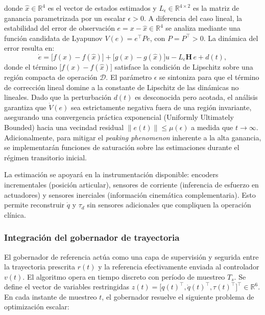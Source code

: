 \documentclass[a4paper,12pt]{article}
\begin{document}
\noindent donde $\hat{x}\in\mathbb{R}^{4}$ es el vector de estados estimados y $L_{\epsilon}\in\mathbb{R}^{4\times 2}$ es la matriz de ganancia parametrizada por un escalar $\epsilon > 0$. A diferencia del caso lineal, la estabilidad del error de observación $e = x - \hat{x}\in\mathbb{R}^{4}$ se analiza mediante una función candidata de Lyapunov $V(e)=e^{\top}Pe$, con $P=P^{\top}>0$. La dinámica del error resulta en:
\begin{equation}
    \dot{e} = \bigl[f(x)-f(\hat{x})\bigr] + \bigl[g(x)-g(\hat{x})\bigr]u - L_{\epsilon}\mathbf{H}\,e + d(t),
    \label{eq:error_obs}
\end{equation}
donde el término $\bigl[f(x)-f(\hat{x})\bigr]$ satisface la condición de Lipschitz sobre una región compacta de operación $\mathcal{D}$. El parámetro $\epsilon$ se sintoniza para que el término de corrección lineal domine a la constante de Lipschitz de las dinámicas no lineales. Dado que la perturbación $d(t)$ es desconocida pero acotada, el análisis garantiza que $\dot{V}(e)$ sea estrictamente negativa fuera de una región invariante, asegurando una convergencia práctica exponencial (Uniformly Ultimately Bounded) hacia una vecindad residual $\|e(t)\| \leq \mu(\epsilon)$ a medida que $t \to \infty$. Adicionalmente, para mitigar el \textit{peaking phenomenon} inherente a la alta ganancia, se implementarán funciones de saturación sobre las estimaciones durante el régimen transitorio inicial.

La estimación se apoyará en la instrumentación disponible: encoders incrementales (posición articular), sensores de corriente (inferencia de esfuerzo en actuadores) y sensores inerciales (información cinemática complementaria). Esto permite reconstruir $\dot{q}$ y $\tau_d$ sin sensores adicionales que compliquen la operación clínica.

\subsubsection{Integración del gobernador de trayectoria}

El gobernador de referencia actúa como una capa de supervisión y segurida entre la trayectoria prescrita $r(t)$ y la referencia efectivamente enviada al controlador $v(t)$. El algoritmo opera en tiempo discreto con período de muestreo $T_s$. Se define el vector de variables restringidas $z(t)=\bigl[q(t)^{\top},\dot{q}(t)^{\top},\tau(t)^{\top}\bigr]^{\top}\in\mathbb{R}^{6}$. En cada instante de muestreo $t$, el gobernador resuelve el siguiente problema de optimización escalar:
\end{document}
